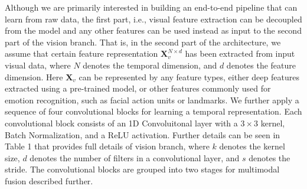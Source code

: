 \documentclass[a4paper,conference]{IEEEtran}
\begin{document}
Although we are primarily interested in building an end-to-end pipeline that can learn from raw data, the first part, i.e., visual feature extraction can be decoupled from the model and any other features can be used instead as input to the second part of the vision branch. That is, in the second part of the architecture, we assume that certain feature representation $\mathbf{X}_v^{N \times d}$ has been extracted from input visual data, where $N$ denotes the temporal dimension, and $d$ denotes the feature dimension. Here $\mathbf{X}_v$ can be represented by any feature types, either deep features extracted using a pre-trained model, or other features commonly used for emotion recognition, such as facial action units or landmarks. We further apply a sequence of four convolutional blocks for learning a temporal representation. Each convolutional block consists of an 1D Convoluitonal layer with a $3 \times 3$ kernel, Batch Normalization, and a ReLU activation. Further details can be seen in Table 1 that provides full details of vision branch, where $k$ denotes the kernel size, $d$ denotes the number of filters in a convolutional layer, and $s$ denotes the stride. The convolutional blocks are grouped into two stages for multimodal fusion described further.
\end{document}
